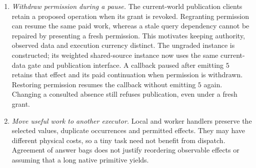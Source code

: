 \documentclass[11pt]{article}
\theoremstyle{definition}
\theoremstyle{remark}
\begin{document}
\begin{enumerate}
Source admission is a separate check. Opaque quoted syntax can finish its
raw traversal while containing an escaped binder. The existing scoped COMM
preservation theorem therefore still requires well-sorted inputs and their
quote-aware binder-safety conditions. Finite traversal does not establish
those conditions, native capture avoidance, memory ownership or physical
service prices.

\item \emph{Withdraw permission during a pause.}
The current-world publication clients retain a proposed operation when its
grant is revoked. Regranting permission can resume the same paid work,
whereas a stale query dependency cannot be repaired by presenting a fresh
permission. This motivates keeping authority, observed data and execution
currency distinct. The ungraded instance is constructed; its weighted
shared-source instance now uses the same current-data gate and publication
interface. A callback paused after emitting $5$ retains that effect and its
paid continuation when permission is withdrawn. Restoring permission resumes
the callback without emitting $5$ again. Changing a consulted absence still
refuses publication, even under a fresh grant.

\item \emph{Move useful work to another executor.}
Local and worker handlers preserve the selected values, duplicate
occurrences and permitted effects. They may have different physical
costs, so a tiny task need not benefit from dispatch. Agreement of answer
bags does not justify reordering observable effects or assuming that a
long native primitive yields.


\end{enumerate}
\end{document}
